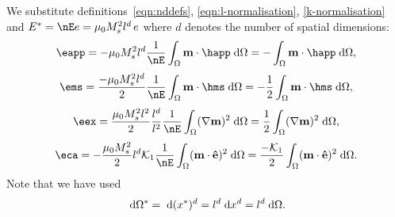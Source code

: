 We substitute definitions~\eqref{eqn:nddefs}, \eqref{eqn:l-normalisation}, \eqref{k-normalisation} and $E^* = \nE e = \mu_0 M_s^2 l^d \, e$ where $d$ denotes the number of spatial dimensions:
\begin{equation*}
  \eapp = -\mu_0 M_s^2 l^d \frac{1}{\nE} \int_{\magd} \mv \cdot \happ \d \magd
  = - \int_{\magd} \mv \cdot \happ \d \magd,
\end{equation*}
\begin{equation}
  \ems = \frac{-\mu_0 M_s^2 l^d}{2} \frac{1}{\nE} \int_{\magd} \mv \cdot \hms \d \magd
  = -\frac{1}{2} \int_{\magd} \mv \cdot \hms \d \magd,
\end{equation}
\begin{equation*}
  \eex =  \frac{\mu_0 M_s^2 l^2}{2} \frac{l^d}{l^2} \frac{1}{\nE} \int_{\magd} (\nabla \mv)^2 \d \magd
  = \frac{1}{2} \int_{\magd} (\nabla \mv)^2 \d \magd,
\end{equation*}
\begin{equation*}
  \eca = - \frac{\mu_0 M_s^2}{2 } l^d \kone \frac{1}{\nE} \int_\magd (\mv \cdot \ev)^2 \d \magd
  = \frac{-\kone}{2} \int_\magd (\mv \cdot \ev)^2 \d \magd.
\end{equation*}
Note that we have used
\begin{equation}
  {\; \text{d}} \Omega^* = {\; \text{d}} (x^*)^d = l^d {\; \text{d}} x^d = l^d {\; \text{d}} \Omega.
\end{equation}


